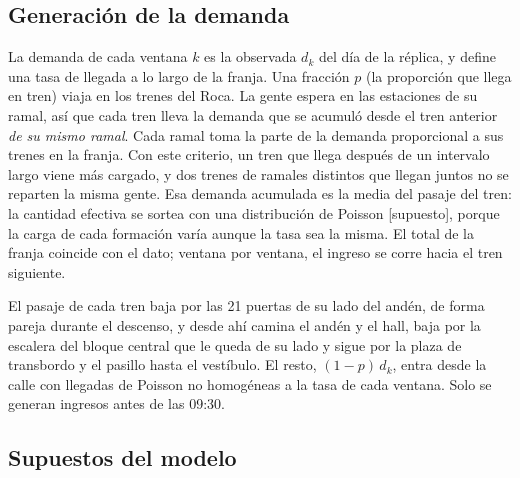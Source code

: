 \subsection{Generación de la demanda}
\label{anx:demanda}

La demanda de cada ventana $k$ es la observada $d_k$ del día de la
réplica, y define una tasa de llegada a lo largo de la franja. Una fracción $p$ (la proporción que llega en tren) viaja en los
trenes del Roca. La gente espera en las estaciones de su ramal, así que cada tren lleva la demanda que se
acumuló desde el tren anterior \emph{de su mismo ramal}. Cada ramal toma la parte de la demanda proporcional
a sus trenes en la franja. Con este criterio, un tren que llega después de un intervalo largo viene más
cargado, y dos trenes de ramales distintos que llegan juntos no se reparten la misma gente. Esa demanda
acumulada es la media del pasaje del tren: la cantidad efectiva se sortea con una distribución de Poisson
[supuesto], porque la carga de cada formación varía aunque la tasa sea la misma. El total de la
franja coincide con el dato; ventana por ventana, el ingreso se corre hacia el tren siguiente.

El pasaje de cada tren baja por las 21 puertas de su lado del andén, de forma pareja durante el descenso,
y desde ahí camina el andén y el hall, baja por la escalera del bloque central que le queda de su lado y sigue
por la plaza de transbordo y el pasillo hasta el vestíbulo. El resto, $(1-p)\,d_k$, entra desde la
calle con llegadas de Poisson no homogéneas a la tasa de cada ventana. Solo se generan ingresos antes de las
09:30.

\subsection{Supuestos del modelo}
\label{anx:supuestos}

